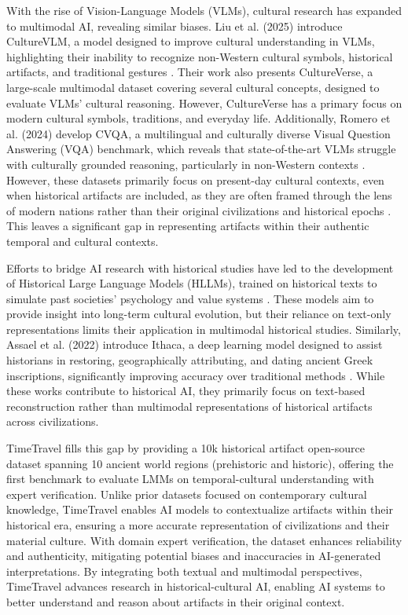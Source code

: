 \documentclass[11pt]{article}
\begin{document}
With the rise of Vision-Language Models (VLMs), cultural research has expanded to multimodal AI, revealing similar biases. Liu et al. (2025) introduce CultureVLM, a model designed to improve cultural understanding in VLMs, highlighting their inability to recognize non-Western cultural symbols, historical artifacts, and traditional gestures \cite{liu2025culturevlm}. Their work also presents CultureVerse, a large-scale multimodal dataset covering several cultural concepts, designed to evaluate VLMs' cultural reasoning. However, CultureVerse has a primary focus on modern cultural symbols, traditions, and everyday life. Additionally, Romero et al. (2024) develop CVQA, a multilingual and culturally diverse Visual Question Answering (VQA) benchmark, which reveals that state-of-the-art VLMs struggle with culturally grounded reasoning, particularly in non-Western contexts \cite{romero2024cvqa}. However, these datasets primarily focus on present-day cultural contexts, even when historical artifacts are included, as they are often framed through the lens of modern nations rather than their original civilizations and historical epochs \cite{liu2025culturevlm}. This leaves a significant gap in representing artifacts within their authentic temporal and cultural contexts.

Efforts to bridge AI research with historical studies have led to the development of Historical Large Language Models (HLLMs), trained on historical texts to simulate past societies' psychology and value systems \cite{varnum2024large}. These models aim to provide insight into long-term cultural evolution, but their reliance on text-only representations limits their application in multimodal historical studies. Similarly, Assael et al. (2022) introduce Ithaca, a deep learning model designed to assist historians in restoring, geographically attributing, and dating ancient Greek inscriptions, significantly improving accuracy over traditional methods \cite{Assael2022RestoringAA}. While these works contribute to historical AI, they primarily focus on text-based reconstruction rather than multimodal representations of historical artifacts across civilizations.

TimeTravel fills this gap by providing a 10k historical artifact open-source dataset spanning 10 ancient world regions (prehistoric and historic), offering the first benchmark to evaluate LMMs on temporal-cultural understanding with expert verification. Unlike prior datasets focused on contemporary cultural knowledge, TimeTravel enables AI models to contextualize artifacts within their historical era, ensuring a more accurate representation of civilizations and their material culture. With domain expert verification, the dataset enhances reliability and authenticity, mitigating potential biases and inaccuracies in AI-generated interpretations. By integrating both textual and multimodal perspectives, TimeTravel advances research in historical-cultural AI, enabling AI systems to better understand and reason about artifacts in their original context.
\end{document}

